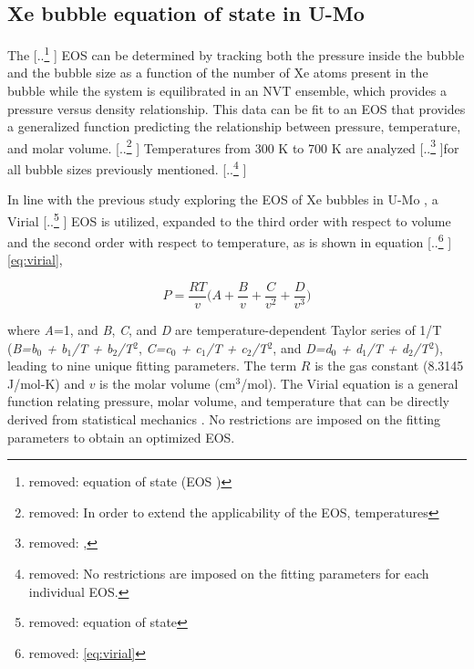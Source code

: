 \documentclass[review]{elsarticle}
\providecommand{\DIFaddtex}[1]{{\protect\color{blue} \sf #1}} %
\providecommand{\DIFdeltex}[1]{{\protect\color{red} [..\footnote{removed: #1} ]}} %
\providecommand{\DIFaddbegin}{} %
\providecommand{\DIFaddend}{} %
\providecommand{\DIFdelbegin}{} %
\providecommand{\DIFdelend}{} %
\providecommand{\DIFadd}[1]{\texorpdfstring{\DIFaddtex{#1}}{#1}} %
\providecommand{\DIFdel}[1]{\texorpdfstring{\DIFdeltex{#1}}{}} %
\newcommand{\DIFscaledelfig}{0.5}
\newlength{\DIFdelgraphicswidth} %
\newlength{\DIFdelgraphicsheight} %
\newcommand{\DIFaddincludegraphics}[2][]{{\color{blue}\fbox{\DIFOincludegraphics[#1]{#2}}}} %
\newcommand{\DIFdelincludegraphics}[2][]{%
\sbox{\DIFdelgraphicsbox}{\DIFOincludegraphics[#1]{#2}}%
\settoboxwidth{\DIFdelgraphicswidth}{\DIFdelgraphicsbox} %
\settoboxtotalheight{\DIFdelgraphicsheight}{\DIFdelgraphicsbox} %
\scalebox{\DIFscaledelfig}{%
\parbox[b]{\DIFdelgraphicswidth}{\usebox{\DIFdelgraphicsbox}\\[-\baselineskip] \rule{\DIFdelgraphicswidth}{0em}}\llap{\resizebox{\DIFdelgraphicswidth}{\DIFdelgraphicsheight}{%
\setlength{\unitlength}{\DIFdelgraphicswidth}%
\begin{picture}(1,1)%
\thicklines\linethickness{2pt} %
{\color[rgb]{1,0,0}\put(0,0){\framebox(1,1){}}}%
{\color[rgb]{1,0,0}\put(0,0){\line( 1,1){1}}}%
{\color[rgb]{1,0,0}\put(0,1){\line(1,-1){1}}}%
\end{picture}%
}\hspace*{3pt}}} %
} %
\DeclareRobustCommand{\DIFaddbegin}{\DIFOaddbegin \let\includegraphics\DIFaddincludegraphics} %
\DeclareRobustCommand{\DIFaddend}{\DIFOaddend \let\includegraphics\DIFOincludegraphics} %
\DeclareRobustCommand{\DIFdelbegin}{\DIFOdelbegin \let\includegraphics\DIFdelincludegraphics} %
\DeclareRobustCommand{\DIFdelend}{\DIFOaddend \let\includegraphics\DIFOincludegraphics} %
\begin{document}
\subsection{Xe bubble equation of state in U-Mo}

The \DIFdelbegin \DIFdel{equation of state (EOS ) }\DIFdelend \DIFaddbegin \DIFadd{EOS }\DIFaddend can be determined by tracking \DIFaddbegin \DIFadd{both }\DIFaddend the pressure inside the bubble and the bubble size as a function of the number of Xe atoms present in the bubble while the system is equilibrated in an NVT ensemble, which provides a pressure versus density relationship. This data can be fit to an EOS that provides a generalized function predicting the relationship between pressure, temperature, and molar volume. \DIFdelbegin \DIFdel{In order to extend the applicability of the EOS, temperatures }\DIFdelend \DIFaddbegin \DIFadd{Temperatures }\DIFaddend from 300 K to 700 K are analyzed \DIFdelbegin \DIFdel{, }\DIFdelend for all bubble sizes previously mentioned. 
\DIFdelbegin \DIFdel{No restrictions are imposed on the fitting parameters for each individual EOS. 
}\DIFdelend 

In line with the previous study exploring the EOS of Xe bubbles in U-Mo \cite{Beeler2020}, a Virial \DIFdelbegin \DIFdel{equation of state }\DIFdelend \DIFaddbegin \DIFadd{EOS }\DIFaddend is utilized, expanded to the third order with respect to volume and the second order with respect to temperature, as is shown in equation \DIFdelbegin \DIFdel{\ref{eq:virial}}\DIFdelend \DIFaddbegin \DIFadd{\cref{eq:virial}}\DIFaddend , 

\begin{equation}
\label{eq:virial}
P=\frac{RT}{v}\bigg( A + \frac{B}{v} + \frac{C}{v^2} + \frac{D}{v^3} \bigg)
\end{equation}

\noindent where \textit{A}=1, and \textit{B}, \textit{C}, and \textit{D} are temperature-dependent Taylor series of 1/T (\textit{B=b$_0$ + b$_1$/T + b$_2$/T$^2$}, \textit{C=c$_0$ + c$_1$/T + c$_2$/T$^2$}, and \textit{D=d$_0$ + d$_1$/T + d$_2$/T$^2$}), leading to nine unique fitting parameters. The term $R$ is the gas constant (8.3145 J/mol-K) and $v$ is the molar volume (cm$^3$/mol). The Virial equation is a general function relating pressure, molar volume, and temperature that can be directly derived from statistical mechanics \cite{virial}. \DIFaddbegin \DIFadd{No restrictions are imposed on the fitting parameters to obtain an optimized EOS. 
}\DIFaddend 
\end{document}
